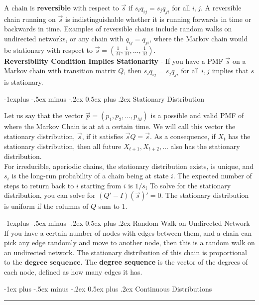 \documentclass[10pt,landscape]{article}
\makeatletter
\theoremstyle{definition}
\renewcommand{\section}{\@startsection{section}{1}{0mm}%
                                {-1ex plus -.5ex minus -.2ex}%
                                {0.5ex plus .2ex}%
                                {\normalfont\large\bfseries}}
\renewcommand{\subsection}{\@startsection{subsection}{2}{0mm}%
                                {-1explus -.5ex minus -.2ex}%
                                {0.5ex plus .2ex}%
                                {\normalfont\normalsize\bfseries}}
\makeatother
\begin{document}
\begin{multicols}{3}
A chain is \textbf{reversible} with respect to $\vec{s}$ if $s_iq_{ij} = s_jq_{ji}$ for all $i, j$.  A reversible chain running on $\vec{s}$ is indistinguishable whether it is running forwards in time or backwards in time. Examples of reversible chains include random walks on undirected networks, or any chain with $q_{ij} = q_{ji}$, where the Markov chain would be stationary with respect to $\vec{s} = (\frac{1}{M}, \frac{1}{M}, \dots, \frac{1}{M})$. \\

\textbf{Reversibility Condition Implies Stationarity} - If you have a PMF $\vec{s}$ on a Markov chain with transition matrix $Q$, then $s_iq_{ij} = s_jq_{ji}$ for all $i, j$ implies that $s$ is stationary.


\subsection{Stationary Distribution}

Let us say that the vector $\vec{p} = (p_1, p_2, \dots, p_M)$ is a possible and valid PMF of where the Markov Chain is at at a certain time. We will call this vector the stationary distribution, $\vec{s}$, if it satisfies $\vec{s}Q = \vec{s}$. As a consequence, if $X_t$ has the stationary distribution, then all future $X_{t+1}, X_{t + 2}, \dots$ also has the stationary distribution. \\

For irreducible, aperiodic chains, the stationary distribution exists, is unique, and $s_i$ is the long-run probability of a chain being at state $i$. The expected number of steps to return back to $i$ starting from $i$ is $1/s_i$ To solve for the stationary distribution, you can solve for $(Q' - I)(\vec{s})' = 0$. The stationary distribution is uniform if the columns of $Q$ sum to 1.


\subsection{Random Walk on Undirected Network}
If you have a certain number of nodes with edges between them, and a chain can pick any edge randomly and move to another node, then this is a random walk on an undirected network. The stationary distribution of this chain is proportional to the $\textbf{degree sequence}.$ The \textbf{degree sequence} is the vector of the degrees of each node, defined as how many edges it has.

\section{Continuous Distributions}\smallskip \hrule height 2pt \smallskip


\end{multicols}
\end{document}
